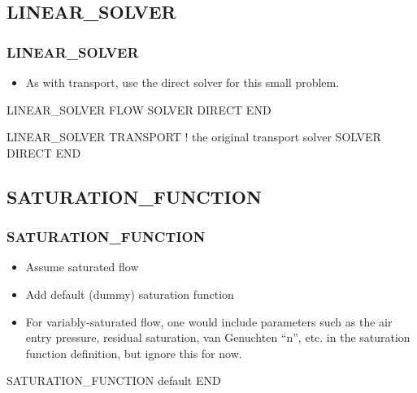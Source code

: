 \documentclass{beamer}
\newcommand\gehcomment[1]{{{\color{orange} #1}}}
\newcommand\bluecomment[1]{{{\color{blue} #1}}}
\newcommand\magentacomment[1]{{{\color{magenta} #1}}}
\begin{document}
\subsection{LINEAR\_SOLVER}

\begin{frame}[fragile]\frametitle{LINEAR\_SOLVER}

\begin{itemize}
\item As with transport, use the direct solver for this small problem.
\end{itemize}


\begin{semiverbatim}

\magentacomment{LINEAR_SOLVER FLOW}
  \magentacomment{SOLVER DIRECT}
\magentacomment{END}

LINEAR_SOLVER TRANSPORT  \bluecomment{! the original transport solver}
  SOLVER DIRECT
END
\end{semiverbatim}

\end{frame}

\subsection{SATURATION\_FUNCTION}

\begin{frame}[fragile]\frametitle{SATURATION\_FUNCTION}

\begin{itemize}
\item Assume saturated flow
\item Add default (dummy) saturation function
\item For variably-saturated flow, one would include parameters such as the air entry pressure, residual saturation, van Genuchten ``n'', etc. in the saturation function definition, \gehcomment{but ignore this for now}.
\end{itemize}

\begin{semiverbatim}

SATURATION_FUNCTION default
END
\end{semiverbatim}

\end{frame}

\end{document}
